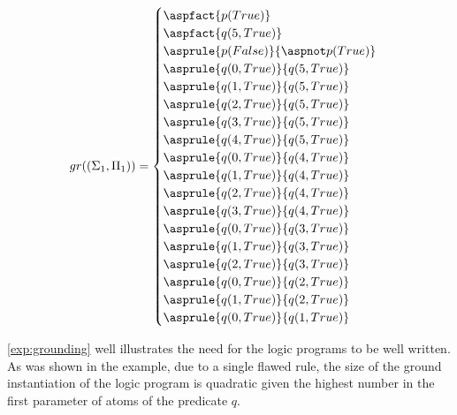 \begin{example}
    \begin{equation*}
        gr((\Sigma_1, \Pi_1)) =
            \begin{cases}
                \aspfact{p(True)}\\
                \aspfact{q(5, True)}\\
                \asprule{p(False)}{\aspnot p(True)}\\
                \asprule{q(0, True)}{q(5, True)}\\
                \asprule{q(1, True)}{q(5, True)}\\
                \asprule{q(2, True)}{q(5, True)}\\
                \asprule{q(3, True)}{q(5, True)}\\
                \asprule{q(4, True)}{q(5, True)}\\
                \asprule{q(0, True)}{q(4, True)}\\
                \asprule{q(1, True)}{q(4, True)}\\
                \asprule{q(2, True)}{q(4, True)}\\
                \asprule{q(3, True)}{q(4, True)}\\
                \asprule{q(0, True)}{q(3, True)}\\
                \asprule{q(1, True)}{q(3, True)}\\
                \asprule{q(2, True)}{q(3, True)}\\
                \asprule{q(0, True)}{q(2, True)}\\
                \asprule{q(1, True)}{q(2, True)}\\
                \asprule{q(0, True)}{q(1, True)}\\
            \end{cases}
    \end{equation*}
\end{example}

\cref{exp:grounding} well illustrates the need for the logic programs
to be well written. As was shown in the example, due to a single flawed rule,
the size of the ground instantiation of the logic program is quadratic
given the highest number in the first parameter of atoms of the predicate $q$.
